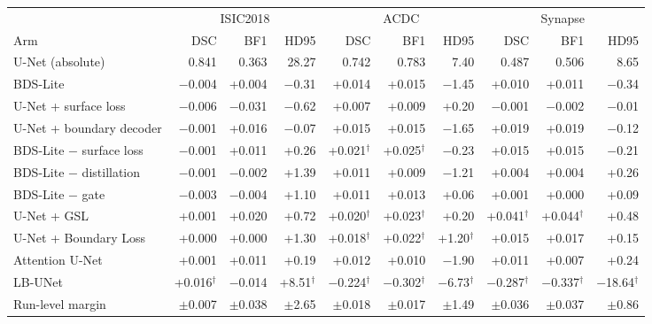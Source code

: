 \begin{tabular}{lrrrrrrrrr}
\toprule
 & \multicolumn{3}{c}{ISIC2018} & \multicolumn{3}{c}{ACDC} & \multicolumn{3}{c}{Synapse} \\
\cmidrule(lr){2-4}\cmidrule(lr){5-7}\cmidrule(lr){8-10}
Arm & DSC & BF1 & HD95 & DSC & BF1 & HD95 & DSC & BF1 & HD95 \\
\midrule
U-Net (absolute) & 0.841 & 0.363 & 28.27 & 0.742 & 0.783 & 7.40 & 0.487 & 0.506 & 8.65 \\
\midrule
BDS-Lite & $-$0.004 & +0.004 & $-$0.31 & +0.014 & +0.015 & $-$1.45 & +0.010 & +0.011 & $-$0.34 \\
\midrule
U-Net + surface loss & $-$0.006 & $-$0.031 & $-$0.62 & +0.007 & +0.009 & +0.20 & $-$0.001 & $-$0.002 & $-$0.01 \\
U-Net + boundary decoder & $-$0.001 & +0.016 & $-$0.07 & +0.015 & +0.015 & $-$1.65 & +0.019 & +0.019 & $-$0.12 \\
BDS-Lite $-$ surface loss & $-$0.001 & +0.011 & +0.26 & +0.021$^{\dagger}$ & +0.025$^{\dagger}$ & $-$0.23 & +0.015 & +0.015 & $-$0.21 \\
BDS-Lite $-$ distillation & $-$0.001 & $-$0.002 & +1.39 & +0.011 & +0.009 & $-$1.21 & +0.004 & +0.004 & +0.26 \\
BDS-Lite $-$ gate & $-$0.003 & $-$0.004 & +1.10 & +0.011 & +0.013 & +0.06 & +0.001 & +0.000 & +0.09 \\
\midrule
U-Net + GSL & +0.001 & +0.020 & +0.72 & +0.020$^{\dagger}$ & +0.023$^{\dagger}$ & +0.20 & +0.041$^{\dagger}$ & +0.044$^{\dagger}$ & +0.48 \\
U-Net + Boundary Loss & +0.000 & +0.000 & +1.30 & +0.018$^{\dagger}$ & +0.022$^{\dagger}$ & +1.20$^{\dagger}$ & +0.015 & +0.017 & +0.15 \\
Attention U-Net & +0.001 & +0.011 & +0.19 & +0.012 & +0.010 & $-$1.90 & +0.011 & +0.007 & +0.24 \\
LB-UNet & +0.016$^{\dagger}$ & $-$0.014 & +8.51$^{\dagger}$ & $-$0.224$^{\dagger}$ & $-$0.302$^{\dagger}$ & $-$6.73$^{\dagger}$ & $-$0.287$^{\dagger}$ & $-$0.337$^{\dagger}$ & $-$18.64$^{\dagger}$ \\
\midrule
Run-level margin & $\pm$0.007 & $\pm$0.038 & $\pm$2.65 & $\pm$0.018 & $\pm$0.017 & $\pm$1.49 & $\pm$0.036 & $\pm$0.037 & $\pm$0.86 \\
\bottomrule
\end{tabular}
